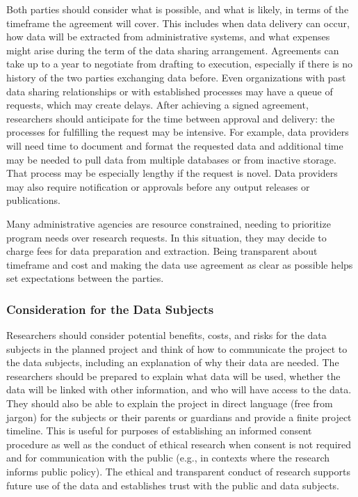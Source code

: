 \documentclass[
]{WileySix}
\begin{document}
Both parties should consider what is possible, and what is likely, in terms of the timeframe the agreement will cover. This includes when data delivery can occur, how data will be extracted from administrative systems, and what expenses might arise during the term of the data sharing arrangement. Agreements can take up to a year to negotiate from drafting to execution, especially if there is no history of the two parties exchanging data before. Even organizations with past data sharing relationships or with established processes may have a queue of requests, which may create delays. After achieving a signed agreement, researchers should anticipate for the time between approval and delivery: the processes for fulfilling the request may be intensive. For example, data providers will need time to document and format the requested data and additional time may be needed to pull data from multiple databases or from inactive storage. That process may be especially lengthy if the request is novel. Data providers may also require notification or approvals before any output releases or publications.

Many administrative agencies are resource constrained, needing to prioritize program needs over research requests. In this situation, they may decide to charge fees for data preparation and extraction. Being transparent about timeframe and cost and making the data use agreement as clear as possible helps set expectations between the parties.

\hypertarget{consideration-for-the-data-subjects}{%
\subsubsection{Consideration for the Data Subjects}\label{consideration-for-the-data-subjects}}

Researchers should consider potential benefits, costs, and risks for the data subjects in the planned project and think of how to communicate the project to the data subjects, including an explanation of why their data are needed. The researchers should be prepared to explain what data will be used, whether the data will be linked with other information, and who will have access to the data. They should also be able to explain the project in direct language (free from jargon) for the subjects or their parents or guardians and provide a finite project timeline. This is useful for purposes of establishing an informed consent procedure as well as the conduct of ethical research when consent is not required and for communication with the public (e.g., in contexts where the research informs public policy). The ethical and transparent conduct of research supports future use of the data and establishes trust with the public and data subjects.
\end{document}
